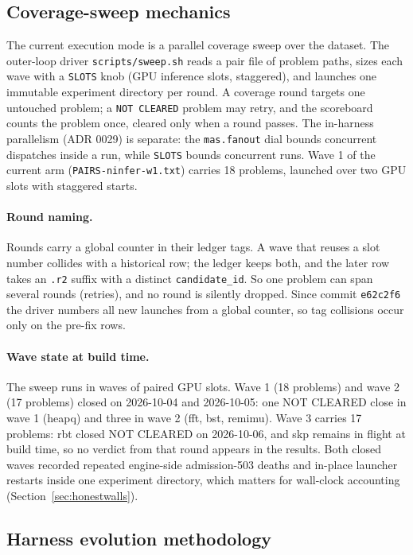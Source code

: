 \documentclass[11pt]{article}
\begin{document}
\subsection{Coverage-sweep mechanics}
\label{sec:sweep}

The current execution mode is a parallel coverage sweep over the
dataset. The outer-loop
driver \texttt{scripts/sweep.sh} reads a pair file of problem paths,
sizes each wave with a \texttt{SLOTS} knob (GPU inference slots,
staggered), and launches one immutable experiment directory per round.
A coverage round targets one untouched problem; a \texttt{NOT CLEARED}
problem may retry, and the scoreboard counts the problem once, cleared
only when a round passes. The in-harness parallelism (ADR 0029) is
separate: the \texttt{mas.fanout} dial bounds concurrent dispatches
inside a run, while \texttt{SLOTS} bounds concurrent runs. Wave 1 of
the current arm (\texttt{PAIRS-ninfer-w1.txt}) carries 18 problems,
launched over two GPU slots with staggered starts.

\paragraph{Round naming.}
Rounds carry a global counter in their ledger tags. A wave that
reuses a slot number collides with a historical row; the ledger keeps
both, and the later row takes an \texttt{.r2} suffix with a distinct
\texttt{candidate\_id}. So one problem can span several rounds
(retries), and no round is silently dropped. Since commit
\texttt{e62c2f6} the driver numbers all new launches from a global
counter, so tag collisions occur only on
the pre-fix rows.

\paragraph{Wave state at build time.}
The sweep runs in waves of paired GPU slots. Wave 1 (18 problems) and
wave 2 (17 problems) closed on 2026-10-04 and 2026-10-05: one
\textsf{NOT CLEARED} close in wave 1 (heapq) and three in wave 2 (fft,
bst, remimu). Wave 3 carries 17 problems: rbt closed \textsf{NOT
CLEARED} on 2026-10-06, and skp remains in flight at build time, so no
verdict from that round appears in the results. Both closed waves
recorded repeated engine-side admission-503 deaths and in-place
launcher restarts inside one experiment directory, which matters for
wall-clock accounting (Section~\ref{sec:honestwalls}).

\subsection{Harness evolution methodology}
\label{sec:optmethod}
\end{document}
